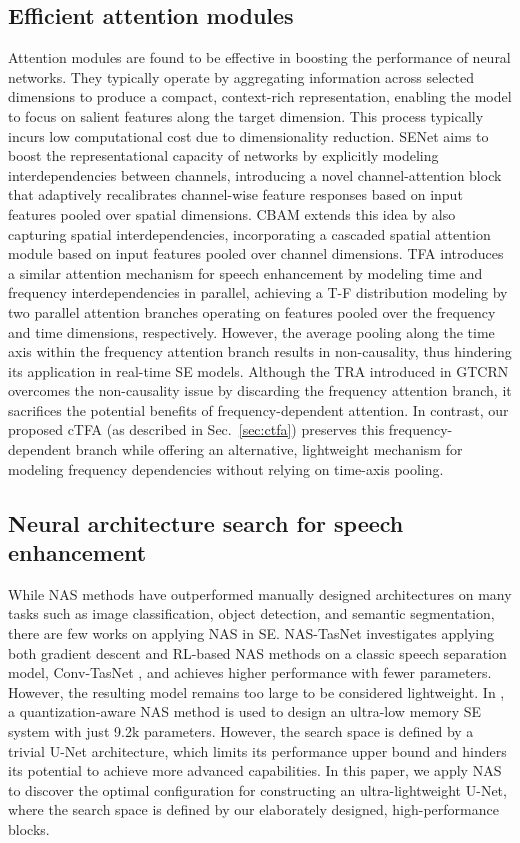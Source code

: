 \documentclass[journal]{IEEEtran}
\newcommand{\rev}[1]{#1}
\begin{document}
\subsection{Efficient attention modules}
Attention modules are found to be effective in boosting the performance of neural networks. They typically operate by aggregating information across selected dimensions to produce a compact, context-rich representation, enabling the model to focus on salient features along the target dimension. This process typically incurs low computational cost due to dimensionality reduction. SENet \cite{SENet} \rev{aims to boost the representational capacity of networks by explicitly modeling interdependencies between channels, introducing} a novel channel-attention block that adaptively recalibrates channel-wise feature responses based on input features pooled over spatial dimensions. CBAM \cite{CBAM} \rev{extends this idea by also capturing spatial interdependencies}, incorporating a cascaded spatial attention module based on input features pooled over channel dimensions. TFA \cite{TFA_taslp} introduces a similar attention mechanism \rev{for speech enhancement by modeling time and frequency interdependencies in parallel}, achieving a T-F distribution modeling by two parallel attention branches operating on features pooled over the frequency and time dimensions, respectively. However, the average pooling along the time axis within the frequency attention branch results in non-causality, thus hindering its application in real-time SE models. Although the TRA introduced in GTCRN overcomes the non-causality issue by discarding the frequency attention branch, it sacrifices the potential benefits of frequency-dependent attention. In contrast, our proposed cTFA (as described in Sec.~\ref{sec:ctfa}) preserves this frequency-dependent branch while \rev{offering an alternative, lightweight mechanism for modeling frequency dependencies without relying on time-axis pooling.}

\subsection{Neural architecture search for speech enhancement}
While NAS methods have outperformed manually designed architectures on many tasks such as image classification, object detection, and semantic segmentation, there are few works on applying NAS in SE. NAS-TasNet \cite{NAS-TasNet} investigates applying both gradient descent and RL-based NAS methods on a classic speech separation model, Conv-TasNet \cite{ConvTasNet}, and achieves higher performance with fewer parameters. However, the resulting model remains too large to be considered lightweight. In \cite{QA-NAS_SE}, a quantization-aware NAS method is used to design an ultra-low memory SE system with just 9.2k parameters. However, the search space is defined by a trivial U-Net architecture, which limits its performance upper bound and hinders its potential to achieve more advanced capabilities. In this paper, we apply NAS to discover the optimal configuration for constructing an ultra-lightweight U-Net, where the search space is defined by our elaborately designed, high-performance blocks.
\end{document}
